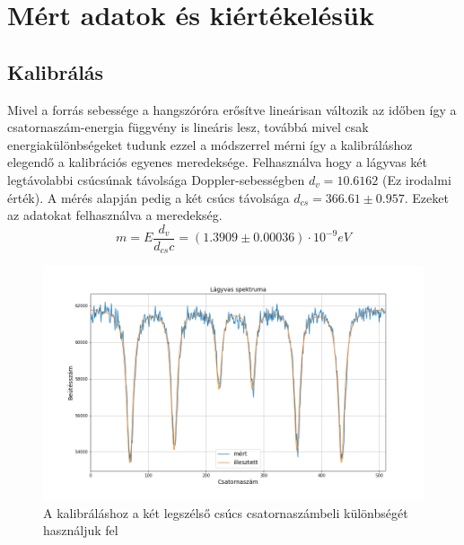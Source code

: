 \documentclass[a4paper,12pt]{article}
\numberwithin{equation}{subsection}
\begin{document}
\section{Mért adatok és kiértékelésük}
\subsection{Kalibrálás}
Mivel a forrás sebessége a hangszóróra erősítve lineárisan változik az időben így a csatornaszám-energia függvény is lineáris lesz, továbbá mivel csak energiakülönbségeket tudunk ezzel a módszerrel mérni így a kalibráláshoz elegendő a kalibrációs egyenes meredeksége. Felhasználva hogy a lágyvas két legtávolabbi csúcsúnak távolsága Doppler-sebességben $d_v=10.6162$ (Ez irodalmi érték). A mérés alapján pedig a két csúcs távolsága $d_{cs}=366.61\pm 0.957$. Ezeket az adatokat felhasználva a meredekség.
\[m=E\frac{d_v}{d_{cs}c}=(1.3909 \pm 0.00036)\cdot10^{-9} eV\]
\begin{figure}[h!]
\centering
\includegraphics[width=12cm]{vas.png}
\caption{A kalibráláshoz a két legszélső csúcs csatornaszámbeli különbségét használjuk fel}
\end{figure}
\end{document}
